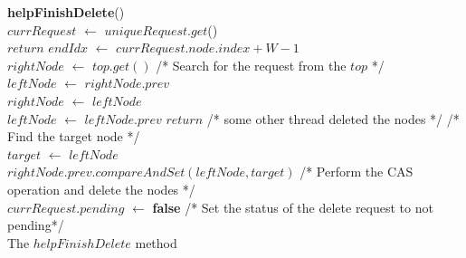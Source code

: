 \documentclass{llncs}
\begin{document}
\vspace{-8mm}
\begin{algorithm}
\scriptsize
\SetAlgoLined
\textbf{helpFinishDelete}(){}\\
		$currRequest$ $\leftarrow$ $uniqueRequest.get$() \label{line:currread} \\
		{
			$return$
		}
$endIdx$ $\leftarrow$ $currRequest.node.index + W - 1$	 \label{line:endidx}\\

			
			$rightNode$ $\leftarrow$ $top.get()$                 /* Search for the request from the $top$ */ \\
		    $leftNode$ $\leftarrow$ $rightNode.prev$ \\	
			 {
				$rightNode$ $\leftarrow$ $leftNode$ \label{line:right} \\
				$leftNode$ $\leftarrow$ $leftNode.prev$ \label{line:left}
			}
			 {
				$return$ /* some other thread deleted the nodes */
			} \label{line:sentinel}
/* Find the target node */ \\
		$target$ $\leftarrow$ $leftNode$  \label{line:targetstart}\\
		 \label{line:targetend}
$rightNode.prev.compareAndSet(leftNode, target)$ /* Perform the CAS operation and delete the nodes */ \label{line:rightcas} \\
$currRequest.pending$ $\leftarrow$ \textbf{false} /* Set the status of the delete request to not pending*/ \label{line:setpending}\\

\caption{The $helpFinishDelete$ method} \label{alg:helpfinishdelete}
\end{algorithm}
\vspace{-8mm}

\begin{comment}
We define a global atomic
variable, $uniqueRequest$. If a delete is not pending 
on $uniqueRequest$, we read its contents, and try to perform a CAS operation on it. We try to atomically
replace its current contents with the argument, $req$. Note that at this stage, only one set of threads
will be successful. Beyond this point, all the threads will be working on the same DeleteRequest. 
They will then move on to call the $helpFinishDelete$ function that will finish the delete request. 
For threads that are not successful in the CAS operation, or threads that find that the current request
contained in $uniqueRequest$ has a delete pending will also call the $helpFinishDelete$ function. This 
is required to ensure wait freedom. 
\end{comment}
\end{document}
